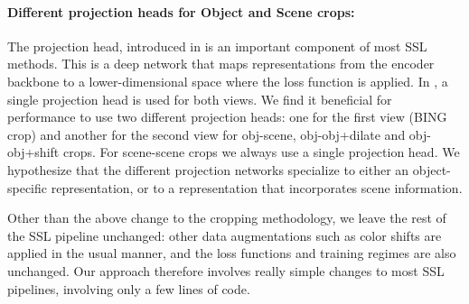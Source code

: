 



\paragraph{Different projection heads for Object and Scene crops:}
The projection head, introduced in \citet{chen2020simple} is an important component of most SSL methods. This is a deep network that maps representations from the encoder backbone to a lower-dimensional space where the loss function is applied. In \citet{chen2020exploring}, a single projection head is used for both views. We find it beneficial for performance to use two different projection heads: one for the first view (BING crop) and another for the second view for obj-scene, obj-obj+dilate and obj-obj+shift crops. For scene-scene crops we always use a single projection head. We hypothesize that the different projection networks specialize to either an object-specific representation, or to a representation that incorporates scene information. 


Other than the above change to the cropping methodology, we leave the rest of the SSL pipeline unchanged: other data augmentations such as color shifts are applied in the usual manner, and the loss functions and training regimes are also unchanged. Our approach therefore involves really simple changes to most SSL pipelines, involving only a few lines of code. 



